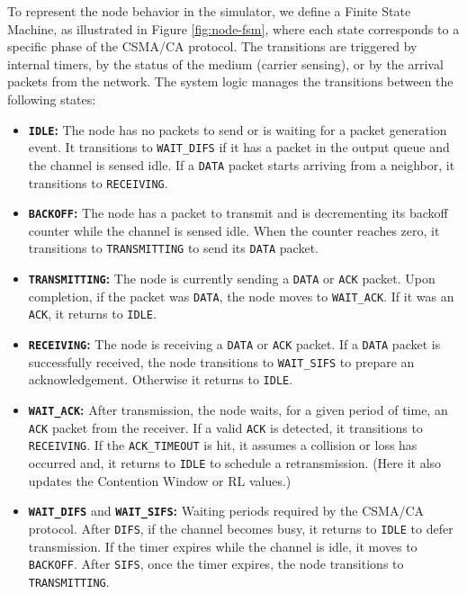 To represent the node behavior in the simulator, we define a Finite State Machine, as illustrated in Figure \ref{fig:node-fsm}, where each state corresponds to a specific phase of the CSMA/CA protocol. The transitions are triggered by internal timers, by the status of the medium (carrier sensing), or by the arrival packets from the network. The system logic manages the transitions between the following states:
\begin{itemize}
    \item \textbf{\texttt{IDLE}:} The node has no packets to send or is waiting for a packet generation event.
    It transitions to \texttt{WAIT\_DIFS} if it has a packet in the output queue and the channel is sensed idle. If a \texttt{DATA} packet starts arriving from a neighbor, it transitions to \texttt{RECEIVING}.
    
    \item \textbf{\texttt{BACKOFF}:} The node has a packet to transmit and is decrementing its backoff counter while the channel is sensed idle.
    When the counter reaches zero, it transitions to \texttt{TRANSMITTING} to send its \texttt{DATA} packet.
    
    \item \textbf{\texttt{TRANSMITTING}:} The node is currently sending a \texttt{DATA} or \texttt{ACK} packet.
    Upon completion, if the packet was \texttt{DATA}, the node moves to \texttt{WAIT\_ACK}. If it was an \texttt{ACK}, it returns to \texttt{IDLE}.
    
    \item \textbf{\texttt{RECEIVING}:} The node is receiving a \texttt{DATA} or \texttt{ACK} packet.
    If a \texttt{DATA} packet is successfully received, the node transitions to \texttt{WAIT\_SIFS} to prepare an acknowledgement. Otherwise it returns to \texttt{IDLE}.
    
    \item \textbf{\texttt{WAIT\_ACK}:} After transmission, the node waits, for a given period of time, an \texttt{ACK} packet from the receiver.
    If a valid \texttt{ACK} is detected, it transitions to \texttt{RECEIVING}. If the \texttt{ACK\_TIMEOUT} is hit, it assumes a collision or loss has occurred and, it returns to \texttt{IDLE} to schedule a retransmission. (Here it also updates the Contention Window or RL values.)
    
    \item \textbf{\texttt{WAIT\_DIFS}} and \textbf{\texttt{WAIT\_SIFS}:} Waiting periods required by the CSMA/CA protocol.
    After \texttt{DIFS}, if the channel becomes busy, it returns to \texttt{IDLE} to defer transmission. If the timer expires while the channel is idle, it moves to \texttt{BACKOFF}.
    After \texttt{SIFS}, once the timer expires, the node transitions to \texttt{TRANSMITTING}.
\end{itemize}

